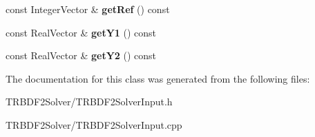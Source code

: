 \begin{DoxyCompactItemize}
\item 
\hypertarget{classTRBDF2SolverInput_a41aa3e4674a8a7aa12f707bbc68794c3}{
const IntegerVector \& {\bfseries getRef} () const }
\label{classTRBDF2SolverInput_a41aa3e4674a8a7aa12f707bbc68794c3}

\item 
\hypertarget{classTRBDF2SolverInput_a9ffded951fea08aed619a88429c7c516}{
const RealVector \& {\bfseries getY1} () const }
\label{classTRBDF2SolverInput_a9ffded951fea08aed619a88429c7c516}

\item 
\hypertarget{classTRBDF2SolverInput_a0812b9c8263ff2e8614749188d9ec7fc}{
const RealVector \& {\bfseries getY2} () const }
\label{classTRBDF2SolverInput_a0812b9c8263ff2e8614749188d9ec7fc}

\end{DoxyCompactItemize}


The documentation for this class was generated from the following files:\begin{DoxyCompactItemize}
\item 
TRBDF2Solver/TRBDF2SolverInput.h\item 
TRBDF2Solver/TRBDF2SolverInput.cpp\end{DoxyCompactItemize}
